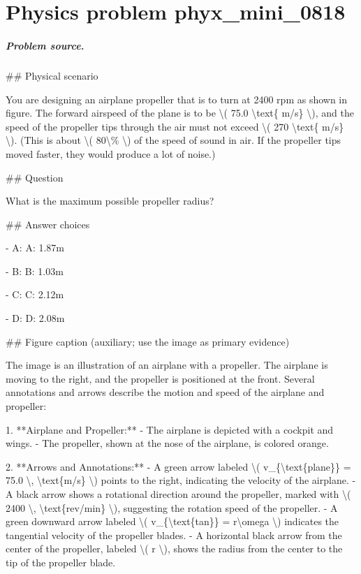 
\chapter{Physics problem phyx\_mini\_0818}
\label{ch:PhyXMiniProblems_problem_phyx_mini_0818}

\paragraph{Problem source.}
\#\# Physical scenario

You are designing an airplane propeller that is to turn at 2400 rpm as shown in figure. The forward airspeed of the plane is to be \textbackslash{}( 75.0 \textbackslash{}text\{ m/s\} \textbackslash{}), and the speed of the propeller tips through the air must not exceed \textbackslash{}( 270 \textbackslash{}text\{ m/s\} \textbackslash{}). (This is about \textbackslash{}( 80\textbackslash{}\% \textbackslash{}) of the speed of sound in air. If the propeller tips moved faster, they would produce a lot of noise.)

\#\# Question

What is the maximum possible propeller radius?

\#\# Answer choices

- A: A: 1.87m

- B: B: 1.03m

- C: C: 2.12m

- D: D: 2.08m

\#\# Figure caption (auxiliary; use the image as primary evidence)

The image is an illustration of an airplane with a propeller. The airplane is moving to the right, and the propeller is positioned at the front. Several annotations and arrows describe the motion and speed of the airplane and propeller:

1. **Airplane and Propeller:**
   - The airplane is depicted with a cockpit and wings.
   - The propeller, shown at the nose of the airplane, is colored orange.

2. **Arrows and Annotations:**
   - A green arrow labeled \textbackslash{}( v\_\{\textbackslash{}text\{plane\}\} = 75.0 \textbackslash{}, \textbackslash{}text\{m/s\} \textbackslash{}) points to the right, indicating the velocity of the airplane.
   - A black arrow shows a rotational direction around the propeller, marked with \textbackslash{}( 2400 \textbackslash{}, \textbackslash{}text\{rev/min\} \textbackslash{}), suggesting the rotation speed of the propeller.
   - A green downward arrow labeled \textbackslash{}( v\_\{\textbackslash{}text\{tan\}\} = r\textbackslash{}omega \textbackslash{}) indicates the tangential velocity of the propeller blades.
   - A horizontal black arrow from the center of the propeller, labeled \textbackslash{}( r \textbackslash{}), shows the radius from the center to the tip of the propeller blade.


